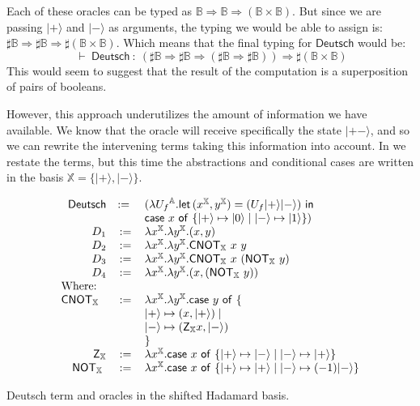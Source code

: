 \documentclass[runningheads,orivec,envcountsame,envcountsect]{llncs}
\newcommand\ket[1]{\ensuremath{|#1\rangle}}
\newcommand\AbsBasis{\ensuremath{\mathbb{A}}}
\def\Pair#1#2{(#1,#2)} %
\def\Lam#1#2#3{\lambda#1^{#2}{.}#3} %
\def\letkeyword{\mathsf{let}}
\def\inkeyword{\mathsf{in}}
\def\LetP#1#2#3#4#5#6{\letkeyword\,\Pair{#1^{#2}}{#3^{#4}}=#5~\inkeyword~#6}
\def\case#1#2#3#4#5{\ensuremath{\mathsf{case}~#1~\mathsf{of}~\{#2\mapsto #4 \mid #3\mapsto #5\}}}
\def\Arr{\Rightarrow}
\def\TYP#1#2#3{#1~{\vdash}~#2~{:}~#3}
\newcommand\B{\mathbb B}
\newcommand\XB{\mathbb X}
\newcommand{\pauliZXB}{\mathsf{Z}_{\XB}}
\newcommand{\cnotXB}[2]{\mathsf{CNOT}_{\XB}\ #1\ #2}
\newcommand{\pauliXXB}[1]{\mathsf{NOT}_{\XB}\ #1}
\begin{document}
Each of these oracles can be typed as $\B\Arr\B\Arr(\B\times\B)$. But since we are passing $\ket{+}$ and $\ket{-}$ as arguments, the typing we would be able to assign is: $\sharp\B\Arr\sharp\B\Arr\sharp(\B\times\B)$. Which means that the final typing for $\mathsf{Deutsch}$ would be:
\[
\TYP{}{\mathsf{Deutsch}}{(\sharp\B\Arr\sharp\B\Arr(\sharp\B\Arr\sharp\B))\Arr\sharp(\B\times\B)}
\]
This would seem to suggest that the result of the computation is a superposition of pairs of booleans.

However, this approach underutilizes the amount of information we have available. We know that the oracle will receive specifically the state $\ket{+-}$, and so we can rewrite the intervening terms taking this information into account. In  we restate the terms, but this time the abstractions and conditional cases are written in the basis $\XB=\{\ket{+},\ket{-}\}$.

\begin{table}
    \footnotesize
    \[
    \begin{array}{r c l}
        \mathsf{Deutsch}&:=~&(\Lam{{U_f}}{\AbsBasis}{
                \LetP{x}{\XB}{y}{\XB}
                {(U_f \ket{+} \ket{-})}
                {\\ && \case{x}{\ket{+}}{\ket{-}}{\ket{0}}{\ket{1}}}})\\
        D_1 &:= &\Lam{x}{\XB}{\Lam{y}{\XB}{\Pair{x}{y}}}\\
        D_2 &:= &\Lam{x}{\XB}{\Lam{y}{\XB}{\cnotXB{x}{y}}}\\
        D_3 &:= &\Lam{x}{\XB}{\Lam{y}{\XB}{\cnotXB{x}{(\pauliXXB{y})}}}\\
        D_4 &:= &\Lam{x}{\XB}{\Lam{y}{\XB}{\Pair{x}{(\pauliXXB{y})}}}\\
        \multicolumn{3}{l}{\text{Where:}}\\
        \cnotXB{}{} &:=& \Lam{x}{\XB}{\Lam{y}{\XB}{
        \case{y}
        {\\ && \ket{+}}{\\ && \ket{-}}
        {\Pair{x}{\ket{+}}}{\Pair{\pauliZXB{x}}{\ket{-}} \\ &&}}}\\
        \pauliZXB{} &:=& \Lam{x}{\XB}{\case{x}{\ket{+}}{\ket{-}}{\ket{-}}{\ket{+}}}\\
        \pauliXXB{} &:=& \Lam{x}{\XB}{\case{x}{\ket{+}}{\ket{-}}{\ket{+}}{(-1)\ket{-}}}\\
    \end{array}
    \]
    \caption{Deutsch term and oracles in the shifted Hadamard basis.}
    \label{tab:DeutschShift}
\end{table}
\end{document}
